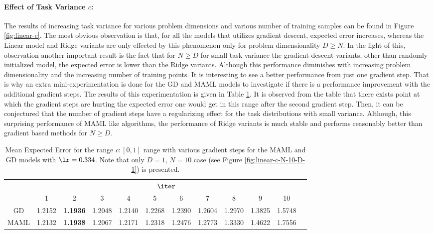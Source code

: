 \paragraph{Effect of Task Variance $c$:} The results of increasing task variance for various problem dimensions and various number of training samples can be found in Figure \ref{fig:linear-c}. The most obvious observation is that, for all the models that utilizes gradient descent, expected error increases, whereas the Linear model and Ridge variants are only effected by this phenomenon only for problem dimensionality $D\geq N$. In the light of this, observation another important result is the fact that for $N\geq D$  for small task variance the gradient descent variants, other than randomly initialized model, the expected error is lower than the Ridge variants. Although this performance diminishes with increasing problem dimensionality and the increasing number of training points. It is interesting to see a better performance from just one gradient step. That is why an extra mini-experimentation is done for the GD and MAML models to investigate if there is a performance improvement with the additional gradient steps. The results of this experimentation is given in Table \ref{tab:zoom}. It is observed from the table that there exists point at which the gradient steps are hurting the expected error one would get in this range after the second gradient step. Then, it can be conjectured that the number of gradient steps have a regularizing effect for the task distributions with small variance. Although, this surprising performance of MAML like algorithms, the performance of Ridge variants is much stable and performs reasonably better than gradient based methods for $N\geq D$.

\begin{table}
  \centering
  \caption{Mean Expected Error for the range $c:[0,1]$ range with various gradient steps for the MAML and GD models with $\lr=0.334$. Note that only $D=1$, $N=10$ case (see Figure \ref{fig:linear-c-N-10-D-1}) is presented.}\label{tab:zoom}
  \begin{tabular}{c|c|c|c|c|c|c|c|c|c|c|c|}
    \cline{2-11}
     & \multicolumn{10}{|c|}{$\iter$}\\
    \cline{2-11}
     & 1 & 2 & 3 & 4 & 5 & 6 & 7 & 8 & 9 & 10\\
    \hline
    \multicolumn{1}{|c|}{GD} & 1.2152 &  \textbf{1.1936} & 1.2048 & 1.2140 &  1.2268 & 1.2390 & 1.2604 & 1.2970 &1.3825 & 1.5748\\
    \hline
    \multicolumn{1}{|c|}{MAML} & 1.2132 & \textbf{1.1938} & 1.2067 & 1.2171 & 1.2318 & 1.2476 & 1.2773 & 1.3330 & 1.4622 & 1.7556  \\
    \hline
    \end{tabular}
\end{table}

